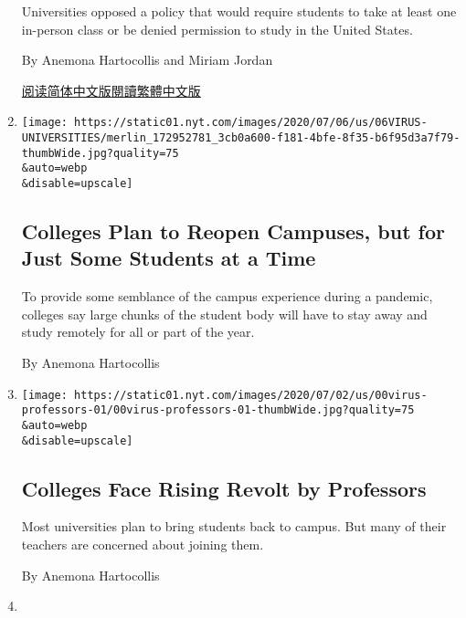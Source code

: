 \begin{enumerate}
  Universities opposed a policy that would require students to take at
  least one in-person class or be denied permission to study in the
  United States.

  By Anemona Hartocollis and Miriam Jordan

  \href{https://cn.nytimes.com/usa/20200709/harvard-mit-trump-ice-students/}{阅读简体中文版}\href{https://cn.nytimes.com/usa/20200709/harvard-mit-trump-ice-students/zh-hant/}{閱讀繁體中文版}
\item
  \href{/2020/07/06/us/coronavirus-universities-colleges-reopening.html}{}

  \texttt{[image: https://static01.nyt.com/images/2020/07/06/us/06VIRUS-UNIVERSITIES/merlin\_172952781\_3cb0a600-f181-4bfe-8f35-b6f95d3a7f79-thumbWide.jpg?quality=75\\\&auto=webp\\\&disable=upscale]}

  \hypertarget{colleges-plan-to-reopen-campuses-but-for-just-some-students-at-a-time}{%
  \subsection{Colleges Plan to Reopen Campuses, but for Just Some
  Students at a
  Time}\label{colleges-plan-to-reopen-campuses-but-for-just-some-students-at-a-time}}

  To provide some semblance of the campus experience during a pandemic,
  colleges say large chunks of the student body will have to stay away
  and study remotely for all or part of the year.

  By Anemona Hartocollis
\item
  \href{/2020/07/03/us/coronavirus-college-professors.html}{}

  \texttt{[image: https://static01.nyt.com/images/2020/07/02/us/00virus-professors-01/00virus-professors-01-thumbWide.jpg?quality=75\\\&auto=webp\\\&disable=upscale]}

  \hypertarget{colleges-face-rising-revolt-by-professors}{%
  \subsection{Colleges Face Rising Revolt by
  Professors}\label{colleges-face-rising-revolt-by-professors}}

  Most universities plan to bring students back to campus. But many of
  their teachers are concerned about joining them.

  By Anemona Hartocollis
\item
  \href{/2020/06/22/us/coronavirus-universities-brain-drain.html}{}


\end{enumerate}
